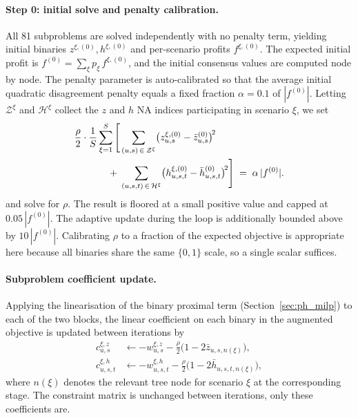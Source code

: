 \documentclass[12pt,a4paper]{article}
\begin{document}
\paragraph{Step 0: initial solve and penalty calibration.}
All 81 subproblems are solved independently with no penalty term, yielding initial binaries $z^{\xi,(0)}, h^{\xi,(0)}$ and per-scenario profits $f^{\xi,(0)}$. The expected initial profit is $f^{(0)} = \sum_\xi p_\xi\, f^{\xi,(0)}$, and the initial consensus values are computed node by node. The penalty parameter is auto-calibrated so that the average initial quadratic disagreement penalty equals a fixed fraction $\alpha = 0.1$ of $|f^{(0)}|$. Letting $\mathcal{Z}^\xi$ and $\mathcal{H}^\xi$ collect the $z$ and $h$ NA indices participating in scenario $\xi$, we set
\begin{align}
  \frac{\rho}{2} \cdot \frac{1}{S}
  \sum_{\xi=1}^{S} \Bigg[
  &\sum_{(u,s)\,\in\,\mathcal{Z}^\xi}
      \!\big(z^{\xi,(0)}_{u,s} - \bar{z}^{(0)}_{u,s}\big)^{\!2} \notag\\
  +\;&\sum_{(u,s,t)\,\in\,\mathcal{H}^\xi}
      \!\big(h^{\xi,(0)}_{u,s,t} - \bar{h}^{(0)}_{u,s,t}\big)^{\!2}
  \Bigg] \;=\; \alpha\,|f^{(0)}|.
\end{align}
and solve for $\rho$. The result is floored at a small positive value and capped at $0.05\,|f^{(0)}|$. The adaptive update during the loop is additionally bounded above by $10\,|f^{(0)}|$. Calibrating $\rho$ to a fraction of the expected objective is appropriate here because all binaries share the same $\{0,1\}$ scale, so a single scalar suffices.

\paragraph{Subproblem coefficient update.}
Applying the linearisation of the binary proximal term (Section~\ref{sec:ph_milp}) to each of the two blocks, the linear coefficient on each binary in the augmented objective is updated between iterations by
\begin{align}
  c^{\xi,z}_{u,s}   &\leftarrow -w^{\xi,z}_{u,s}   - \tfrac{\rho}{2}\big(1 - 2\bar{z}_{u,s,n(\xi)}\big),\\
  c^{\xi,h}_{u,s,t} &\leftarrow -w^{\xi,h}_{u,s,t} - \tfrac{\rho}{2}\big(1 - 2\bar{h}_{u,s,t,n(\xi)}\big),
\end{align}
where $n(\xi)$ denotes the relevant tree node for scenario $\xi$ at the corresponding stage. The constraint matrix is unchanged between iterations, only these coefficients are.
\end{document}
